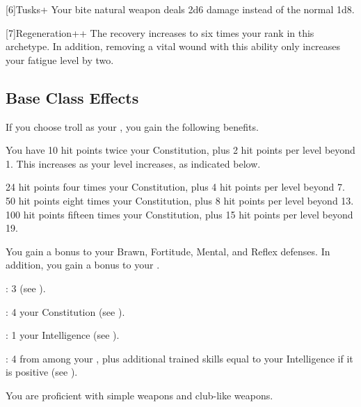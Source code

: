     [6]{Tusks+} Your bite natural weapon deals 2d6 damage instead of the normal 1d8.

    [7]{Regeneration++} The recovery increases to six times your rank in this archetype.
      In addition, removing a vital wound with this ability only increases your fatigue level by two.

  \subsection{Base Class Effects}
    \veryhighhpprogressiontable

    If you choose troll as your , you gain the following benefits.

      You have 10 hit points \add twice your Constitution, plus 2 hit points per level beyond 1.
      This increases as your level increases, as indicated below.
      \begin{raggeditemize}
         24 hit points \add four times your Constitution, plus 4 hit points per level beyond 7.
         50 hit points \add eight times your Constitution, plus 8 hit points per level beyond 13.
         100 hit points \add fifteen times your Constitution, plus 15 hit points per level beyond 19.
      \end{raggeditemize}

      You gain a  bonus to your Brawn, Fortitude, Mental, and Reflex defenses.
      In addition, you gain a  bonus to your .

      \begin{raggeditemize}
          \item {}: 3 (see ).
          \item {}: 4 \add your Constitution (see ).
          \item {}: 1 \add your Intelligence (see ).
          \item {}: 4 from among your , plus additional trained skills equal to your Intelligence if it is positive (see ).
      \end{raggeditemize}

      You are proficient with simple weapons and club-like weapons.

